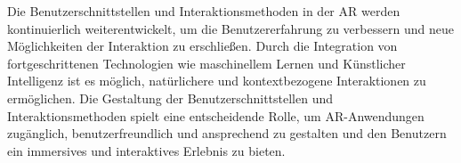 Die Benutzerschnittstellen und Interaktionsmethoden in der AR werden
kontinuierlich weiterentwickelt, um die Benutzererfahrung zu verbessern und
neue Möglichkeiten der Interaktion zu erschließen. Durch die Integration von
fortgeschrittenen Technologien wie maschinellem Lernen und Künstlicher
Intelligenz ist es möglich, natürlichere und kontextbezogene Interaktionen zu
ermöglichen. Die Gestaltung der Benutzerschnittstellen und Interaktionsmethoden
spielt eine entscheidende Rolle, um AR-Anwendungen zugänglich,
benutzerfreundlich und ansprechend zu gestalten und den Benutzern ein
immersives und interaktives Erlebnis zu bieten.